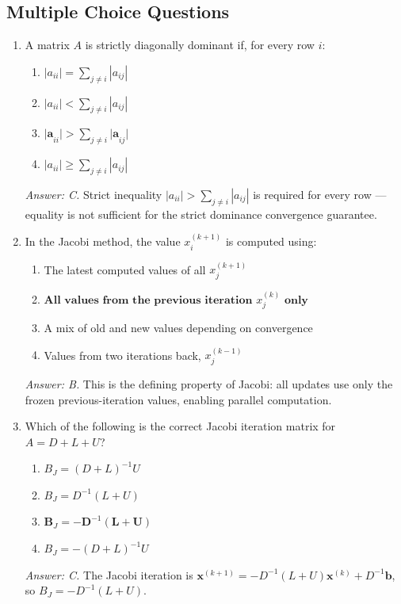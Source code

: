 \documentclass[12pt,a4paper]{article}
\begin{document}
\subsection*{Multiple Choice Questions}

\begin{enumerate}

\item A matrix \(A\) is strictly diagonally dominant if, for every row \(i\):
\begin{enumerate}[label=\Alph*.]
  \item \(|a_{ii}| = \displaystyle\sum_{j\neq i}|a_{ij}|\)
  \item \(|a_{ii}| < \displaystyle\sum_{j\neq i}|a_{ij}|\)
  \item \(\textbf{|a}_{ii}\textbf{|} > \displaystyle\sum_{j\neq i}\textbf{|a}_{ij}\textbf{|}\)
  \item \(|a_{ii}| \geq \displaystyle\sum_{j\neq i}|a_{ij}|\)
\end{enumerate}
\textit{Answer: C.} Strict inequality \(|a_{ii}| > \sum_{j\neq i}|a_{ij}|\) is required
for every row --- equality is not sufficient for the strict dominance convergence guarantee.

\item In the Jacobi method, the value \(x_i^{(k+1)}\) is computed using:
\begin{enumerate}[label=\Alph*.]
  \item The latest computed values of all \(x_j^{(k+1)}\)
  \item \(\textbf{All values from the previous iteration }x_j^{(k)}\textbf{ only}\)
  \item A mix of old and new values depending on convergence
  \item Values from two iterations back, \(x_j^{(k-1)}\)
\end{enumerate}
\textit{Answer: B.} This is the defining property of Jacobi: all updates use only the frozen
previous-iteration values, enabling parallel computation.

\item Which of the following is the correct Jacobi iteration matrix for \(A = D + L + U\)?
\begin{enumerate}[label=\Alph*.]
  \item \(B_J = (D+L)^{-1}U\)
  \item \(B_J = D^{-1}(L+U)\)
  \item \(\textbf{B}_J = \mathbf{-D}^{-1}\mathbf{(L+U)}\)
  \item \(B_J = -(D+L)^{-1}U\)
\end{enumerate}
\textit{Answer: C.} The Jacobi iteration is \(\mathbf{x}^{(k+1)} = -D^{-1}(L+U)\mathbf{x}^{(k)}
+ D^{-1}\mathbf{b}\), so \(B_J = -D^{-1}(L+U)\).


\end{enumerate}
\end{document}
